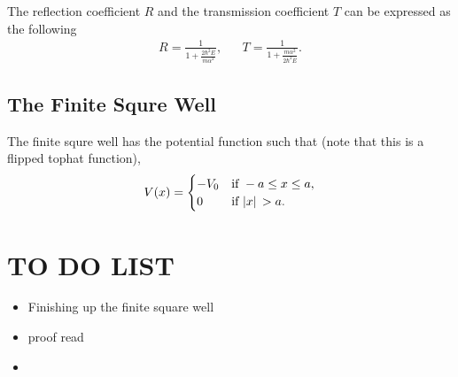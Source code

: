 \documentclass[a4paper]{article}
\begin{document}
\par The reflection coefficient $R$ and the transmission coefficient $T$ can be expressed as the following
\begin{align*}
    R = \frac{1}{1+\frac{2\hbar^2E}{m\alpha^2}}, &&  T = \frac{1}{1+\frac{m\alpha^2}{2\hbar^2E}}.
\end{align*}

\subsection{The Finite Squre Well}
\par The finite squre well has the potential function such that (note that this is a flipped tophat function),
\[
    V(x) = 
        \begin{cases}
            -V_{0} & \text{if } -a \leq x \leq a,\\
            0 & \text{if } \abs*{x} > a.
        \end{cases}    
\]












\newpage
\section*{TO DO LIST}
\begin{itemize}
    \item Finishing up the finite square well
    \item proof read
    \item 
\end{itemize}
\end{document}
